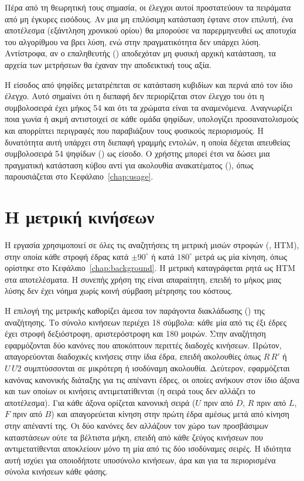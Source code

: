 Πέρα από τη θεωρητική τους σημασία, οι έλεγχοι αυτοί προστατεύουν τα πειράματα από μη έγκυρες εισόδους. Αν μια μη επιλύσιμη κατάσταση έφτανε στον επιλυτή, ένα αποτέλεσμα  (εξάντληση χρονικού ορίου) θα μπορούσε να παρερμηνευθεί ως αποτυχία του αλγορίθμου να βρει λύση, ενώ στην πραγματικότητα δεν υπάρχει λύση. Αντίστροφα, αν ο επαληθευτής () αποδεχόταν μη φυσική αρχική κατάσταση, τα αρχεία των μετρήσεων θα έχαναν την αποδεικτική τους αξία.

Η είσοδος από ψηφίδες μετατρέπεται σε κατάσταση κυβιδίων και περνά από τον ίδιο έλεγχο. Αυτό σημαίνει ότι η διεπαφή δεν περιορίζεται στον έλεγχο του ότι η συμβολοσειρά έχει μήκος 54 και ότι τα χρώματα είναι τα αναμενόμενα. Αναγνωρίζει ποια γωνία ή ακμή αντιστοιχεί σε κάθε ομάδα ψηφίδων, υπολογίζει προσανατολισμούς και απορρίπτει περιγραφές που παραβιάζουν τους φυσικούς περιορισμούς. Η δυνατότητα αυτή υπάρχει στη διεπαφή γραμμής εντολών, η οποία δέχεται απευθείας συμβολοσειρά 54 ψηφίδων () ως είσοδο. Ο χρήστης μπορεί έτσι να δώσει μια πραγματική κατάσταση κύβου αντί για ακολουθία ανακατέματος (), όπως παρουσιάζεται στο Κεφάλαιο~\ref{chap:usage}.

\section{Η μετρική κινήσεων}
\label{sec:model-metric}
Η εργασία χρησιμοποιεί σε όλες τις αναζητήσεις τη μετρική μισών στροφών (, HTM), στην οποία κάθε στροφή έδρας κατά \(\pm 90^\circ\) ή κατά \(180^\circ\) μετρά ως μία κίνηση, όπως ορίστηκε στο Κεφάλαιο~\ref{chap:background}. Η μετρική καταγράφεται ρητά ως HTM στα αποτελέσματα. Η συνεπής χρήση της είναι απαραίτητη, επειδή το μήκος μιας λύσης δεν έχει νόημα χωρίς κοινή σύμβαση μέτρησης του κόστους.

Η επιλογή της μετρικής καθορίζει άμεσα τον παράγοντα διακλάδωσης () της αναζήτησης. Το σύνολο κινήσεων περιέχει 18 σύμβολα: κάθε μία από τις έξι έδρες έχει στροφή δεξιόστροφη, αριστερόστροφη και 180 μοιρών. Στην αναζήτηση εφαρμόζονται δύο κανόνες που αποκόπτουν περιττές διαδοχές κινήσεων. Πρώτον, απαγορεύονται διαδοχικές κινήσεις στην ίδια έδρα, επειδή ακολουθίες όπως \(R\,R'\) ή \(U\,U2\) συμπτύσσονται σε μικρότερη ή ισοδύναμη ακολουθία. Δεύτερον, εφαρμόζεται κανόνας κανονικής διάταξης για τις απέναντι έδρες, οι οποίες ανήκουν στον ίδιο άξονα και των οποίων οι κινήσεις αντιμετατίθενται (η σειρά τους δεν αλλάζει το αποτέλεσμα). Για κάθε άξονα ορίζεται κανονική σειρά (\(U\) πριν από \(D\), \(R\) πριν από \(L\), \(F\) πριν από \(B\)) και απαγορεύεται κίνηση στην πρώτη έδρα αμέσως μετά από κίνηση στην απέναντί της. Οι δύο κανόνες δεν αλλάζουν τον χώρο των προσβάσιμων καταστάσεων ούτε τα βέλτιστα μήκη, επειδή από κάθε ζεύγος κινήσεων που αντιμετατίθενται αποκλείουν μόνο τη μία από τις δύο ισοδύναμες σειρές. Η ιδιότητα αυτή ισχύει για οποιοδήποτε υποσύνολο κινήσεων, άρα και για τα περιορισμένα σύνολα κινήσεων κάθε φάσης.

